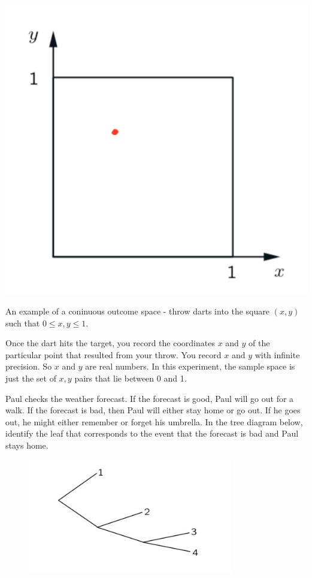 \documentclass{tufte-handout}
\begin{document}
\begin{marginfigure}
  \includegraphics[width=\linewidth]{ContinousSpace}
  \caption{An example of a coninuous outcome space - throw darts into the square $(x, y)$ such that $0 \leq x, y \leq 1$.}
  \label{fig:marginfig}
\end{marginfigure}



Once the dart hits the target, you record the coordinates $x$ and $y$ of the particular point that resulted
from your throw. You record $x$ and $y$ with infinite precision. So $x$ and $y$ are real numbers. In
this experiment, the sample space is just the set of $x, y$ pairs that lie between 0 and 1.



 Paul checks the weather forecast. If the forecast is good, Paul will go out for a walk. If the forecast is bad, then Paul will either stay home or go out. If he goes out, he might either remember or forget his umbrella. In the tree diagram below, identify the leaf that corresponds to the event that the forecast is bad and Paul stays home.

\begin{figure}
  \includegraphics[height=5cm]{Question2}
\end{figure}
\end{document}
